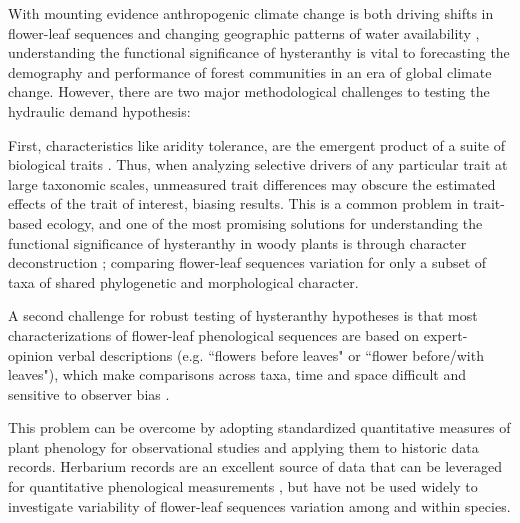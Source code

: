 \documentclass{article}[11pt]
\begin{document}

\noindent With mounting evidence anthropogenic climate change is both driving shifts in flower-leaf sequences \citep{Ma2020:aa} and changing geographic patterns of water availability \citep{Overpeck11856}, understanding the functional significance of hysteranthy is vital to forecasting the demography and performance of forest communities in an era of global climate change. However, there are two major methodological challenges to testing the hydraulic demand hypothesis:

\noindent First, characteristics like aridity tolerance, are the emergent product of a suite of biological traits \citep{Simova:2017vk}. Thus, when analyzing selective drivers of any particular trait at large taxonomic scales, unmeasured trait differences may obscure the estimated effects of the trait of interest, biasing results. %
This is a common problem in trait-based ecology, and one of the most promising solutions for understanding the functional significance of hysteranthy in woody plants is through character deconstruction \citep{Terribile2009}; comparing flower-leaf sequences variation for only a subset of taxa of shared phylogenetic and morphological character.   

\noindent A second challenge for robust testing of hysteranthy hypotheses is that most characterizations of flower-leaf phenological sequences are based on expert-opinion verbal descriptions (e.g. ``flowers before leaves" or ``flower before/with leaves"), which make comparisons across taxa, time and space difficult and sensitive to observer bias  \citep[see;][]{Buonaiuto2020}. 

\noindent This problem can be overcome by adopting standardized quantitative measures of plant phenology for observational studies and applying them to historic data records. Herbarium records are an excellent source of data that can be leveraged for quantitative phenological measurements \citep{Willis2017}, but have not be used widely to investigate variability of flower-leaf sequences variation among and within species.
\end{document}
